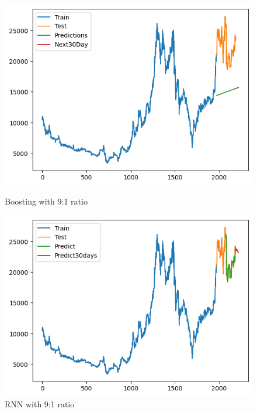 \documentclass[conference]{IEEEtran}
\begin{document}
\begin{figure}[H]
    \centering
    \begin{minipage}{0.24\textwidth}
        \centering
        \includegraphics[width=\textwidth]{Figure/ELC/boosting91.png}
        \caption{Boosting with 9:1 ratio}
        \label{fig:image1}
    \end{minipage}
    \hfill
    \begin{minipage}{0.24\textwidth}
        \centering
        \includegraphics[width=\textwidth]{Figure/ELC/rnn91.png}
        \caption{RNN with 9:1 ratio}
        \label{fig:image2}
    \end{minipage}
\end{figure}
\end{document}
